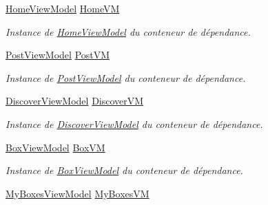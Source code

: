 \begin{DoxyCompactItemize}
\hyperlink{class_boxes_1_1_view_models_1_1_home_view_model}{Home\+View\+Model} \hyperlink{class_boxes_1_1_view_models_1_1_view_model_locator_a17d96e814bc7c1214550bf6c2886e1a7}{Home\+VM}
\begin{DoxyCompactList}\small\item\em Instance de \hyperlink{class_boxes_1_1_view_models_1_1_home_view_model}{Home\+View\+Model} du conteneur de dépendance. \end{DoxyCompactList}\item 
\hyperlink{class_boxes_1_1_view_models_1_1_post_view_model}{Post\+View\+Model} \hyperlink{class_boxes_1_1_view_models_1_1_view_model_locator_a53fa74150ef34e1636bdf94285a79e95}{Post\+VM}
\begin{DoxyCompactList}\small\item\em Instance de \hyperlink{class_boxes_1_1_view_models_1_1_post_view_model}{Post\+View\+Model} du conteneur de dépendance. \end{DoxyCompactList}\item 
\hyperlink{class_boxes_1_1_view_models_1_1_discover_view_model}{Discover\+View\+Model} \hyperlink{class_boxes_1_1_view_models_1_1_view_model_locator_a9a81399827716e28c9fdc4dafb2819ab}{Discover\+VM}
\begin{DoxyCompactList}\small\item\em Instance de \hyperlink{class_boxes_1_1_view_models_1_1_discover_view_model}{Discover\+View\+Model} du conteneur de dépendance. \end{DoxyCompactList}\item 
\hyperlink{class_boxes_1_1_view_models_1_1_box_view_model}{Box\+View\+Model} \hyperlink{class_boxes_1_1_view_models_1_1_view_model_locator_a6b1f993e24dc1bf4a9e3662b3e9ffe9e}{Box\+VM}
\begin{DoxyCompactList}\small\item\em Instance de \hyperlink{class_boxes_1_1_view_models_1_1_box_view_model}{Box\+View\+Model} du conteneur de dépendance. \end{DoxyCompactList}\item 
\hyperlink{class_boxes_1_1_view_models_1_1_my_boxes_view_model}{My\+Boxes\+View\+Model} \hyperlink{class_boxes_1_1_view_models_1_1_view_model_locator_a10461c875e7c2b84136dbfcf103c1b7e}{My\+Boxes\+VM}

\end{DoxyCompactItemize}
